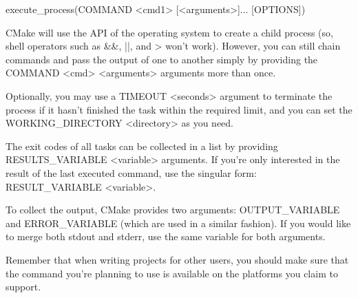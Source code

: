 \begin{shell}
execute_process(COMMAND <cmd1> [<arguments>]... [OPTIONS])
\end{shell}

CMake will use the API of the operating system to create a child process (so, shell operators such as \&\&, ||, and > won’t work). However, you can still chain commands and pass the output of one to another simply by providing the COMMAND <cmd> <arguments> arguments more than once.

Optionally, you may use a TIMEOUT <seconds> argument to terminate the process if it hasn’t finished the task within the required limit, and you can set the WORKING\_DIRECTORY <directory> as you need.

The exit codes of all tasks can be collected in a list by providing RESULTS\_VARIABLE <variable> arguments. If you’re only interested in the result of the last executed command, use the singular form: RESULT\_VARIABLE <variable>.

To collect the output, CMake provides two arguments: OUTPUT\_VARIABLE and ERROR\_VARIABLE (which are used in a similar fashion). If you would like to merge both stdout and stderr, use the same variable for both arguments.

Remember that when writing projects for other users, you should make sure that the command you’re planning to use is available on the platforms you claim to support.








